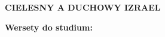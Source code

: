 \documentclass[10pt,a4paper,oneside]{article}
\begin{document}
\centerline{\textbf{\MakeUppercase{Cielesny a duchowy Izrael}}}
\begin{center}
\textbf{Wersety do studium:} 

\end{center}
\end{document}

